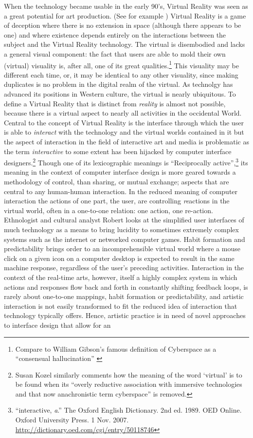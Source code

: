 When the technology became usable in the early 90's, Virtual Reality was seen as a great potential for art production. (See for example \citet{moser96,wood98,dixon07}) Virtual Reality is a game of deception where there is no extension in space (although there appears to be one) and where existence depends entirely on the interactions between the subject and the Virtual Reality technology. The virtual is disembodied and lacks a general visual component: the fact that users are able to mold their own (virtual) visuality is, after all, one of its great qualities.\footnote{Compare to William Gibson's famous definition of Cyberspace as a ``consensual hallucination'' \citep[51]{gibson84}} This visuality may be different each time, or, it may be identical to any other visuality, since making duplicates is no problem in the digital realm of the virtual. As technolgy has advanced its positions in Western culture, the virtual is nearly ubiquitous. To define a Virtual Reality that is distinct from \emph{reality} is almost not possible, because there is a virtual aspect to nearly all activities in the occidental World. \citep[See][]{baudrillard02:screened,frisk08} Central to the concept of Virtual Reality is the interface through which the user is able to \emph{interact} with the technology and the virtual worlds contained in it but the aspect of interaction in the field of interactive art and media is problematic as the term \emph{interactive} to some extent has been hijacked by computer interface designers.\footnote{Susan Kozel similarly comments how the meaning of the word `virtual' is to be found when its ``overly reductive association with immersive technologies and that now anachronistic term cyberspace'' is removed.} Though one of its lexicographic meanings is ``Reciprocally active'',\footnote{``interactive, \textit{a}.'' The Oxford English Dictionary. 2nd ed. 1989. OED Online. Oxford University Press. 1 Nov. 2007. \url{http://dictionary.oed.com/cgi/entry/50118746}} its meaning in the context of computer interface design is more geared towards a methodology of control, than sharing, or mutual exchange; aspects that are central to any human-human interaction. In the reduced meaning of computer interaction the actions of one part, the user, are controlling \emph{re}actions in the virtual world, often in a one-to-one relation: one action, one re-action. Ethnologist and cultural analyst Robert \citet{willim06} looks at the simplified user interfaces of much technology as a means to bring lucidity to sometimes extremely complex systems such as the internet or networked computer games. Habit formation and predictability brings order to an incomprehensible virtual world where a mouse click on a given icon on a computer desktop is expected to result in the same machine response, regardless of the user's preceding activities. Interaction in the context of the real-time arts, however, itself a highly complex system in which actions and responses flow back and forth in constantly shifting feedback loops, is rarely about one-to-one mappings, habit formation or predictability, and artistic interaction is not easily transformed to fit the reduced idea of interaction that technology typically offers. Hence, artistic practice is in need of novel approaches to interface design that allow for an 